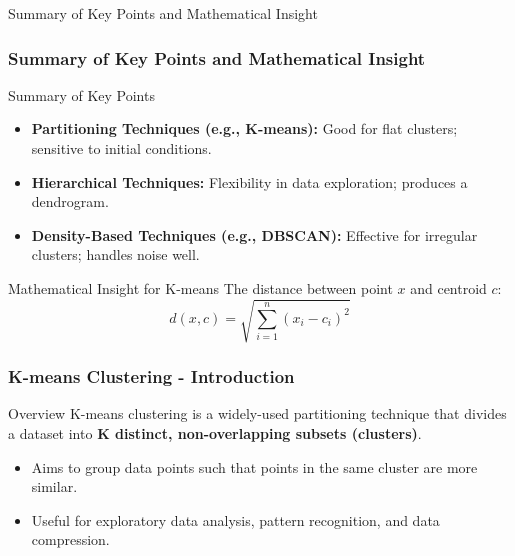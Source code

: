 \documentclass[aspectratio=169]{beamer}
\begin{document}
\begin{frame}[fragile]{Summary of Key Points and Mathematical Insight}
    \frametitle{Summary of Key Points and Mathematical Insight}
    \begin{block}{Summary of Key Points}
        \begin{itemize}
            \item \textbf{Partitioning Techniques (e.g., K-means):} Good for flat clusters; sensitive to initial conditions.
            \item \textbf{Hierarchical Techniques:} Flexibility in data exploration; produces a dendrogram.
            \item \textbf{Density-Based Techniques (e.g., DBSCAN):} Effective for irregular clusters; handles noise well.
        \end{itemize}
    \end{block}
    
    \begin{block}{Mathematical Insight for K-means}
        The distance between point $x$ and centroid $c$:
        \begin{equation}
        d(x, c) = \sqrt{\sum_{i=1}^{n}(x_i - c_i)^2}
        \end{equation}
    \end{block}
\end{frame}

\begin{frame}[fragile]
    \frametitle{K-means Clustering - Introduction}
    \begin{block}{Overview}
        K-means clustering is a widely-used partitioning technique that divides a dataset into \textbf{K distinct, non-overlapping subsets (clusters)}. 
        \begin{itemize}
            \item Aims to group data points such that points in the same cluster are more similar.
            \item Useful for exploratory data analysis, pattern recognition, and data compression.
        \end{itemize}
    \end{block}
\end{frame}
\end{document}
